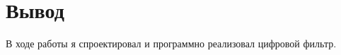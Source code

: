 \chapter{Вывод}
\label{ch:сhap5}

В ходе работы я спроектировал и программно реализовал цифровой фильтр.
\endinput